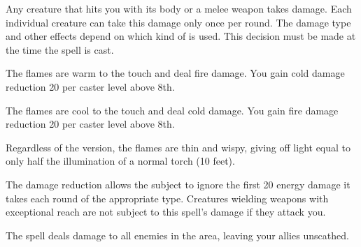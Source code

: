 \spellrng{\rngpers}
\begin{spelleffect}
  Any creature that hits you with its body or a melee weapon takes damage. Each individual creature can take this damage only once per round. The damage type and other effects depend on which kind of  is used. This decision must be made at the time the spell is cast.

  \par {} The flames are warm to the touch and deal fire damage. You gain cold damage reduction 20  per caster level above 8th.
  \par {} The flames are cool to the touch and deal cold damage. You gain fire damage reduction 20  per caster level above 8th.

  Regardless of the version, the flames are thin and wispy, giving off light equal to only half the illumination of a normal torch (10 feet).
\end{spelleffect}
\begin{spellnotes}
  The damage reduction allows the subject to ignore the first 20 energy damage it takes each round of the appropriate type. Creatures wielding weapons with exceptional reach are not subject to this spell's damage if they attack you.
\end{spellnotes}

\spellrng{\rngmed}
\begin{spelleffect}
  The spell deals damage to all enemies in the area, leaving your allies unscathed.
\end{spelleffect}

